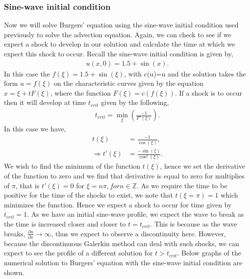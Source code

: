 \documentclass[a4paper, 12pt]{article}
\begin{document}
\subsubsection{Sine-wave initial condition}
Now we will solve Burgers' equation using the sine-wave initial condition used previously to solve the advection equation. Again, we can check to see if we expect a shock to develop in our solution and calculate the time at which we expect this shock to occur. Recall the sine-wave initial condition is given by,
\begin{align*}
u(x,0) = 1.5 + \sin(x).
\end{align*}
In this case the $f(\xi)=1.5+\sin(\xi)$, with c(u)=u and the solution takes the form $u=f(\xi)$ on the characteristic curves given by the equation $x = \xi + tF(\xi)$, where the function $F(\xi) = c(f(\xi))$. If a shock is to occur then it will develop at time $t_{crit}$ given by the following,
\begin{align*}
t_{crit} = \min_{\xi} \left(\frac{-1}{F'(\xi)} \right).
\end{align*} 
In this case we have,
\begin{align*}
t(\xi) &= \frac{-1}{\cos(\xi)},\\ 
\Rightarrow t'(\xi) &= \frac{-\sin(\xi)}{\cos^2(\xi)}.
\end{align*}
We wish to find the minimum of the function $t(\xi)$, hence we set the derivative of the function to zero and we find that derivative is equal to zero for multiplies of $\pi$, that is $t'(\xi)=0$ for $\xi = n\pi, for n\in\mathbb{Z}$. As we require the time to be positive for the time of the shocks to exist, we note that $t(\xi=\pi) = 1$ which minimizes the function. Hence we expect a shock to occur for time given by $t_{crit}=1$. As we have an initial sine-wave profile, we expect the wave to break as the time is increased closer and closer to $t=t_{crit}$. This is because as the wave breaks, $\frac{\partial u}{\partial x}\rightarrow \infty$, thus we expect to observe a discontinuity here. However, because the discontinuous Galerkin method can deal with such shocks, we can expect to see the profile of a different solution for $t>t_{crit}$. Below graphs of the numerical solution to Burgers' equation with the sine-wave initial condition are shown. \\
 
\end{document}
